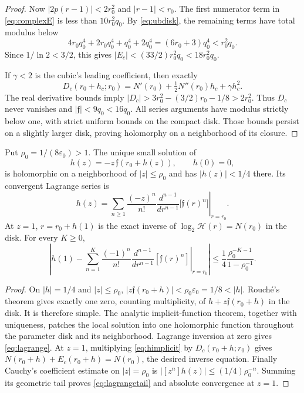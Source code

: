 \begin{proof}
Now $|2p(r-1)|<2r_0^2$ and $|r-1|<r_0$.
The first numerator term in \eqref{eq:complexE} is less than
$10r_0^2q_0$. By \eqref{eq:ubdisk}, the remaining terms have
total modulus below
\[
 4r_0q_0^4+2r_0q_0^4+q_0^4+2q_0^4
 =(6r_0+3)q_0^4<r_0^2q_0.
\]
Since $1/\ln2<3/2$, this gives
$|E_c|<(33/2)r_0^2q_0<18r_0^2q_0$.

If $\gamma<2$ is the cubic's leading coefficient, then exactly
\[
 D_c(r_0+h_c;r_0)=N'(r_0)+\tfrac12N''(r_0)h_c+\gamma h_c^2.
\]
The real derivative bounds imply
$|D_c|>3r_0^2-(3/2)r_0-1/8>2r_0^2$.
Thus $D_c$ never vanishes and $|\mathfrak f|<9q_0<16q_0$.
All series arguments have modulus strictly below one, with strict
uniform bounds on the compact disk. Those bounds persist on a
slightly larger disk, proving holomorphy on a neighborhood of its closure.
\end{proof}

\begin{theorem}\label{thm:lagrange}
Put $\rho_0=1/(8\varepsilon_0)>1$. The unique small solution of
\begin{equation}\label{eq:himplicit}
 h(z)=-z\,\mathfrak f(r_0+h(z)),\qquad h(0)=0,
\end{equation}
is holomorphic on a neighborhood of $|z|\le\rho_0$ and has
$|h(z)|<1/4$ there. Its convergent Lagrange series is
\begin{equation}\label{eq:lagrange}
 h(z)=\sum_{n\ge1}\frac{(-z)^n}{n!}
 \left.\frac{d^{n-1}}{dr^{n-1}}\bigl[\mathfrak f(r)^n\bigr]
 \right|_{r=r_0}.
\end{equation}
At $z=1$, $r=r_0+h(1)$ is the exact inverse of
$\log_2\mathcal H(r)=N(r_0)$ in the disk. For every $K\ge0$,
\begin{equation}\label{eq:lagrangetail}
 \left|h(1)-\sum_{n=1}^K\frac{(-1)^n}{n!}
 \left.\frac{d^{n-1}}{dr^{n-1}}[\mathfrak f(r)^n]\right|_{r=r_0}\right|
 \le\frac14\frac{\rho_0^{-K-1}}{1-\rho_0^{-1}}.
\end{equation}
\end{theorem}
\begin{proof}
On $|h|=1/4$ and $|z|\le\rho_0$,
$|z\mathfrak f(r_0+h)|<\rho_0\varepsilon_0=1/8<|h|$.
Rouch\'e's theorem gives exactly one zero, counting multiplicity,
of $h+z\mathfrak f(r_0+h)$ in the disk. It is therefore simple.
The analytic implicit-function theorem, together with uniqueness,
patches the local solution into one holomorphic function throughout
the parameter disk and its neighborhood. Lagrange inversion at zero
gives \eqref{eq:lagrange}. At $z=1$, multiplying
\eqref{eq:himplicit} by $D_c(r_0+h;r_0)$ gives
$N(r_0+h)+E_c(r_0+h)=N(r_0)$, the desired inverse equation.
Finally Cauchy's coefficient estimate on $|z|=\rho_0$ is
$|[z^n]h(z)|\le(1/4)\rho_0^{-n}$. Summing its geometric tail
proves \eqref{eq:lagrangetail} and absolute convergence at $z=1$.
\end{proof}

